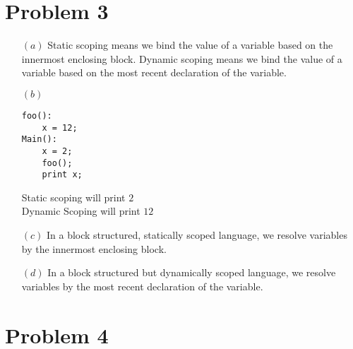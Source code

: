 \documentclass[1pt]{article}
\begin{document}
\section{Problem 3}
\begin{enumerate}
\item[$(a)$] Static scoping means we bind the value of a variable based on the innermost enclosing block.  Dynamic scoping means we bind the value of a variable based on the most recent declaration of the variable.
\item[$(b)$]

\begin{verbatim}
foo():
    x = 12;
Main():
    x = 2;
    foo();
    print x;
\end{verbatim}

Static scoping will print $2$\\
Dynamic Scoping will print $12$\\

\item[$(c)$] In a block structured, statically scoped language, we resolve variables by the innermost enclosing block.

\item[$(d)$] In a block structured but dynamically scoped language, we resolve variables by the most recent declaration of the variable.

\end{enumerate}

\pagebreak
\section{Problem 4}
\end{document}
